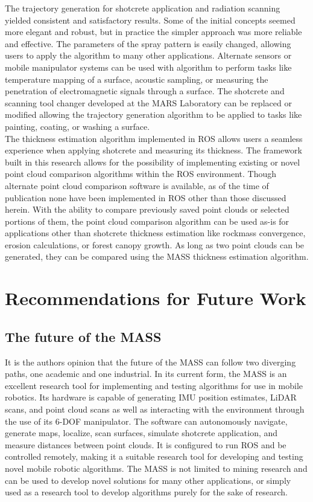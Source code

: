 The trajectory generation for shotcrete application and radiation scanning yielded consistent and satisfactory results. Some of the initial concepts seemed more elegant and robust, but in practice the simpler approach was more reliable and effective. The parameters of the spray pattern is easily changed, allowing users to apply the algorithm to many other applications. Alternate sensors or mobile manipulator systems can be used with algorithm to perform tasks like temperature mapping of a surface, acoustic sampling, or measuring the penetration of electromagnetic signals through a surface. The shotcrete and scanning tool changer developed at the MARS Laboratory can be replaced or modified allowing the trajectory generation algorithm to be applied to tasks like painting, coating, or washing a surface.\\

The thickness estimation algorithm implemented in ROS allows users a seamless experience when applying shotcrete and measuring its thickness. The framework built in this research allows for the possibility of implementing existing or novel point cloud comparison algorithms within the ROS environment. Though alternate point cloud comparison software is available, as of the time of publication none have been implemented in ROS other than those discussed herein. With the ability to compare previously saved point clouds or selected portions of them, the point cloud comparison algorithm can be used as-is for applications other than shotcrete thickness estimation like rockmass convergence, erosion calculations, or forest canopy growth. As long as two point clouds can be generated, they can be compared using the MASS thickness estimation algorithm.\\

\section{Recommendations for Future Work}
\subsection{The future of the MASS}

It is the authors opinion that the future of the MASS can follow two diverging paths, one academic and one industrial. In its current form, the MASS is an excellent research tool for implementing and testing algorithms for use in mobile robotics. Its hardware is capable of generating IMU position estimates, LiDAR scans, and point cloud scans as well as interacting with the environment through the use of its 6-DOF manipulator. The software can autonomously navigate, generate maps, localize, scan surfaces, simulate shotcrete application, and measure distances between point clouds. It is configured to run ROS and be controlled remotely, making it a suitable research tool for developing and testing novel mobile robotic algorithms. The MASS is not limited to mining research and can be used to develop novel solutions for many other applications, or simply used as a research tool to develop algorithms purely for the sake of research.\\

